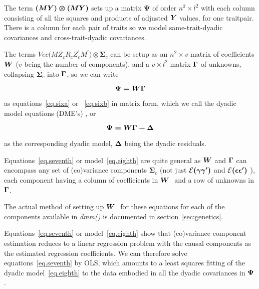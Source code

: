 \documentclass[titlepage]{article}  %
\begin{document}
The term $\mbox{\boldmath $(MY)\otimes(MY)$}$ sets up a matrix ${\bm \Psi}$ of order $n^{2}\times l^{2}$ with each column consisting of all the squares and products of adjusted $\mbox{\boldmath $Y$}$ values, for one traitpair. There is a column for each pair of traits so we model same-trait-dyadic covariances and cross-trait-dyadic covariances.

The terms $Vec{\bm (MZ_{c} R_{c} Z_{c}^{\prime}M^{\prime})} \otimes {\bm \Sigma_{c}}$  can be setup as an $n^{2}\times v$ matrix of coefficients $\mbox{\boldmath $W$}$ ($v$ being the number of components), and a $v\times l^{2}$ matrix $\mbox{\boldmath $\Gamma$}$ of unknowns, collapsing ${\bm \Sigma_{c}}$ into $\mbox{\boldmath $\Gamma$}$, so we can write

\begin{equation}
\mbox{\boldmath $\Psi = W \Gamma$}   \label{eq.seventh}
\end{equation}

as equations~\ref{eq.sixa} or ~\ref{eq.sixb} in matrix form, which we call the dyadic model equations (DME's) , or

\begin{equation}
\mbox{\boldmath $\Psi = W \Gamma + \Delta$}   \label{eq.eighth}
\end{equation}

as the corresponding dyadic model, $\mbox{\boldmath $\Delta$}$ being the dyadic residuals.

Equations~\ref{eq.seventh} or model~\ref{eq.eighth} are quite general as $\mbox{\boldmath $W$}$ and $\mbox{\boldmath $\Gamma$}$ can encompass any set of (co)variance components ${\bm \Sigma_{c}}$ (not just ${\cal E}\mbox{\boldmath $(\gamma \gamma^{\prime})$}$ and ${\cal E}\mbox{\boldmath $(\epsilon \epsilon^{\prime})$}$ ), each component having a column of coefficients in $\mbox{\boldmath $W$ }$ and a row of unknowns in $\mbox{\boldmath $\Gamma$}$.

The actual method of setting up $\mbox{\boldmath $W$ }$ for these equations for each of the components available in {\em dmm()} is documented in section~\ref{sec:genetics}. 

Equations~\ref{eq.seventh} or model~\ref{eq.eighth} show that (co)variance component estimation reduces to a linear regression problem with the causal components as the estimated regression coefficients. We can therefore solve equations~\ref{eq.seventh} by OLS, which amounts to a least squares fitting of the dyadic model~\ref{eq.eighth} to the data embodied in all the dyadic covariances in $\mbox{\boldmath $\Psi$}$.
\end{document}
